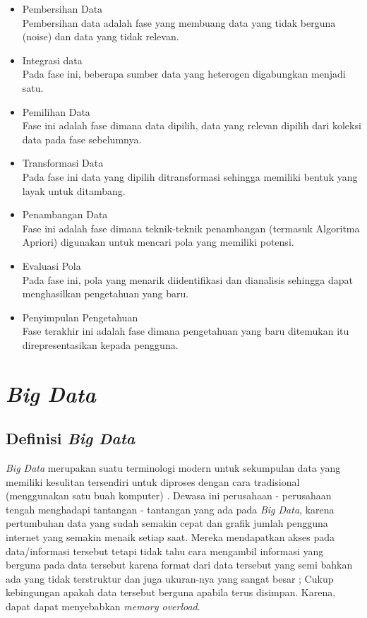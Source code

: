\begin{itemize}
	\item{Pembersihan Data} \\
	Pembersihan data adalah fase yang membuang data yang tidak berguna (noise) dan data yang tidak relevan.
	\item{Integrasi data} \\
	Pada fase ini, beberapa sumber data yang heterogen digabungkan menjadi satu.
	\item{Pemilihan Data} \\
	Fase ini adalah fase dimana data dipilih, data yang relevan dipilih dari koleksi data pada fase sebelumnya.
	\item{Transformasi Data} \\
	Pada fase ini data yang dipilih ditransformasi sehingga memiliki bentuk yang layak untuk ditambang.
	\item{Penambangan Data} \\
	Fase ini adalah fase dimana teknik-teknik penambangan (termasuk Algoritma Apriori) digunakan untuk mencari pola yang memiliki potensi.
	\item{Evaluasi Pola} \\
	Pada fase ini, pola yang menarik diidentifikasi dan dianalisis sehingga dapat menghasilkan pengetahuan yang baru.
	\item{Penyimpulan Pengetahuan} \\
	Fase terakhir ini adalah fase dimana pengetahuan yang baru ditemukan itu direpresentasikan kepada pengguna.
\end{itemize}

\section{{\it Big Data}}

\subsection{Definisi {\it Big Data}}
{\it Big Data} merupakan suatu terminologi modern untuk sekumpulan data yang memiliki kesulitan tersendiri untuk diproses dengan cara tradisional (menggunakan satu buah komputer) \cite{zikopoulos2011understanding}. Dewasa ini perusahaan - perusahaan tengah menghadapi tantangan - tantangan yang ada pada {\it Big Data}, karena pertumbuhan data yang sudah semakin cepat dan grafik jumlah pengguna internet yang semakin menaik setiap saat. Mereka mendapatkan akses pada data/informasi tersebut tetapi tidak tahu cara mengambil informasi yang berguna pada data tersebut karena format dari data tersebut yang semi bahkan ada yang tidak terstruktur dan juga ukuran-nya yang sangat besar ; Cukup kebingungan apakah data tersebut berguna apabila terus disimpan. Karena, dapat dapat menyebabkan {\it memory overload}.

